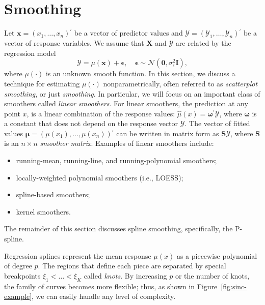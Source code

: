 \documentclass[cmfont,usenames,dvipsnames,leqno]{afit-etd}\usepackage[]{graphicx}\usepackage[]{color}
\newcommand{\trans}{\ensuremath{^\prime}}
\newcommand{\bc}[1]{\ensuremath{\bm{\mathcal{#1}}}}
\newcommand{\mc}[1]{\ensuremath{\mathcal{#1}}}
\newcommand{\wh}[1]{\ensuremath{\widehat{#1}}}
\newcommand{\X}{\ensuremath{\bm{X}}}
\begin{document}
\section{Smoothing}
\label{sec:penalized-regression-splines}
Let $\bm{x} = \left(x_1, \dotsc, x_n \right)\trans$ be a vector of predictor values and $\bc{Y} = \left( \mc{Y}_1, \dotsc, \mc{Y}_n \right)\trans$ be a vector of response variables. We assume that $\X$ and $\bc{Y}$ are related by the regression model
\begin{equation*}
  \bc{Y} = \mu(\bm{x}) + \bm{\epsilon}, \quad \bm{\epsilon} \sim \mc{N}(\bm{0}, \sigma_\epsilon^2\bm{I}),
\end{equation*}
where $\mu(\cdot)$ is an unknown smooth function. In this section, we discuss a technique for estimating $\mu(\cdot)$ nonparametrically, often referred to as \textit{scatterplot smoothing}, or just \textit{smoothing}. In particular, we will focus on an important class of smoothers called \textit{linear smoothers}. For linear smoothers, the prediction at any point $x$, is a linear combination of the response values: $\wh{\mu}(x) = \bm{\omega}\trans\bc{Y}$, where $\bm{\omega}$ is a constant that does not depend on the response vector $\bc{Y}$. The vector of fitted values $\wh{\bm{\mu}} = \left( \mu(x_1), \dotsc, \mu(x_n) \right)\trans$ can be written in matrix form as $\bm{S}\bc{Y}$, where $\bm{S}$ is an $n \times n$ \textit{smoother matrix}. Examples of linear smoothers include:
\begin{itemize}
  \item running-mean, running-line, and running-polynomial smoothers;
  \item locally-weighted polynomial smoothers (i.e., LOESS);
  \item spline-based smoothers;
  \item kernel smoothers.
\end{itemize}
The remainder of this section discusses spline smoothing, specifically, the \ac{P-spline}.  

Regression splines represent the mean response $\mu(x)$ as a piecewise polynomial of degree $p$. The regions that define each piece are separated by special breakpoints  $\xi_1 < \dotsc < \xi_K$ called \textit{knots}. By increasing $p$ or the number of knots, the family of curves becomes more flexible; thus, as shown in Figure~\ref{fig:sinc-example}, we can easily handle any level of complexity. 
\end{document}
